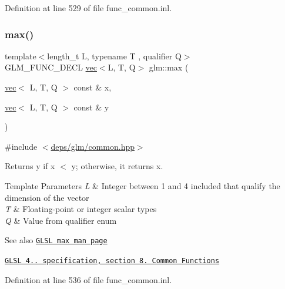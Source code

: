 Definition at line 529 of file func\+\_\+common.\+inl.

\mbox{\label{group__core__func__common_gad48b723358c68d45477c22ff0101985e}} 
\subsubsection{\texorpdfstring{max()}{max()}\hspace{0.1cm}{\footnotesize\ttfamily [3/3]}}
{\footnotesize\ttfamily template$<$length\+\_\+t L, typename T , qualifier Q$>$ \\
G\+L\+M\+\_\+\+F\+U\+N\+C\+\_\+\+D\+E\+CL \hyperlink{structglm_1_1vec}{vec}$<$L, T, Q$>$ glm\+::max (\begin{DoxyParamCaption}\item[{\hyperlink{structglm_1_1vec}{vec}$<$ L, T, Q $>$ const \&}]{x,  }\item[{\hyperlink{structglm_1_1vec}{vec}$<$ L, T, Q $>$ const \&}]{y }\end{DoxyParamCaption})}



{\ttfamily \#include $<$\hyperlink{common_8hpp}{deps/glm/common.\+hpp}$>$}

Returns y if x $<$ y; otherwise, it returns x.


\begin{DoxyTemplParams}{Template Parameters}
{\em L} & Integer between 1 and 4 included that qualify the dimension of the vector \\
\hline
{\em T} & Floating-\/point or integer scalar types \\
\hline
{\em Q} & Value from qualifier enum\\
\hline
\end{DoxyTemplParams}
\begin{DoxySeeAlso}{See also}
\href{http://www.opengl.org/sdk/docs/manglsl/xhtml/max.xml}{\tt G\+L\+SL max man page} 

\href{http://www.opengl.org/registry/doc/GLSLangSpec.4.20.8.pdf}{\tt G\+L\+SL 4.. specification, section 8. Common Functions} 
\end{DoxySeeAlso}


Definition at line 536 of file func\+\_\+common.\+inl.

\mbox{\label{group__core__func__common_ga2c2bde1cec025b7ddff83c74a1113719}} 
